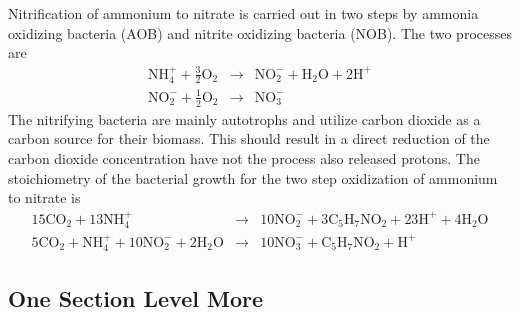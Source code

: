 Nitrification of ammonium to nitrate is carried out in two steps by ammonia oxidizing bacteria (AOB) and nitrite oxidizing bacteria (NOB). The two processes are
\begin{eqnarray*}
\mbox{NH}_4^+ + \frac{3}{2}\mbox{O}_2 & \rightarrow & \mbox{NO}_2^-+\mbox{H}_2\mbox{O}+2\mbox{H}^+\\
\mbox{NO}_2^-+\frac{1}{2}\mbox{O}_2 & \rightarrow & \mbox{NO}_3^-
\end{eqnarray*}
The nitrifying bacteria are mainly autotrophs and utilize carbon dioxide as a carbon source for their biomass. This should result in a direct reduction of the carbon dioxide concentration have not the process also released protons. The stoichiometry of the bacterial growth for the two step oxidization of ammonium to nitrate is \cite{HHJ:SBK:90}
\begin{eqnarray}
15\mbox{CO}_2+13\mbox{NH}_4^+ & \rightarrow & 10\mbox{NO}_2^-+ 3\mbox{C}_{5}\mbox{H}_{7}\mbox{N}\mbox{O}_2+23\mbox{H}^++4\mbox{H}_2\mbox{O} \label{eq:NOB}\\
5\mbox{CO}_2+\mbox{NH}_4^++10\mbox{NO}_2^-+2\mbox{H}_2\mbox{O}& \rightarrow & 10\mbox{NO}_3^-+\mbox{C}_{5}\mbox{H}_{7}\mbox{N}\mbox{O}_2+\mbox{H}^+\label{eq:AOB}
\end{eqnarray}

\subsection{One Section Level More}

